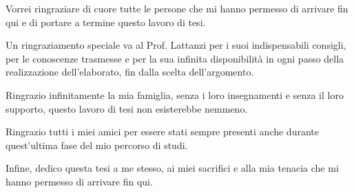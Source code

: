 \documentclass[a4paper,singleside,11pt]{report}
\begin{document}

\copertinatesi 
{}
\indice
\indicefigure
\iniziatesto










\ringraziamenti
Vorrei ringraziare di cuore tutte le persone che mi hanno permesso di arrivare fin qui e di portare a termine questo lavoro di tesi.

Un ringraziamento speciale va al Prof. Lattanzi per i suoi indispensabili consigli, per le conoscenze trasmesse e per la sua infinita disponibilità in ogni passo della realizzazione dell'elaborato, fin dalla scelta dell'argomento.

Ringrazio infinitamente la mia famiglia, senza i loro insegnamenti e senza il loro supporto, questo lavoro di tesi non esisterebbe nemmeno.

Ringrazio tutti i miei amici per essere stati sempre presenti anche durante quest'ultima fase del mio percorso di studi.

Infine, dedico questa tesi a me stesso, ai miei sacrifici e alla mia tenacia che mi hanno permesso di arrivare fin qui.
\end{document}
